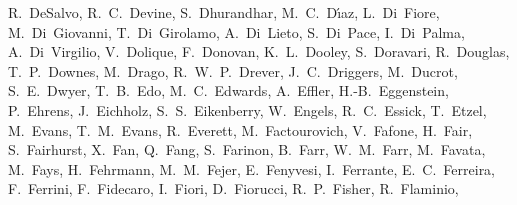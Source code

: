 {R.~DeSalvo,  %
R.~C.~Devine,  %
S.~Dhurandhar,  %
M.~C.~D\'{\i}az,  %
L.~Di~Fiore, %
M.~Di~Giovanni, %
T.~Di~Girolamo, %
A.~Di~Lieto, %
S.~Di~Pace, %
I.~Di~Palma,  %
A.~Di~Virgilio, %
V.~Dolique, %
F.~Donovan,  %
K.~L.~Dooley,  %
S.~Doravari,  %
R.~Douglas,  %
T.~P.~Downes,  %
M.~Drago,  %
R.~W.~P.~Drever,  %
J.~C.~Driggers,  %
M.~Ducrot, %
S.~E.~Dwyer,  %
T.~B.~Edo,  %
M.~C.~Edwards,  %
A.~Effler,  %
H.-B.~Eggenstein,  %
P.~Ehrens,  %
J.~Eichholz,  %
S.~S.~Eikenberry,  %
W.~Engels,  %
R.~C.~Essick,  %
T.~Etzel,  %
M.~Evans,  %
T.~M.~Evans,  %
R.~Everett,  %
M.~Factourovich,  %
V.~Fafone, %
H.~Fair,	%
S.~Fairhurst,  %
X.~Fan,  %
Q.~Fang,  %
S.~Farinon, %
B.~Farr,  %
W.~M.~Farr,  %
M.~Favata,  %
M.~Fays,  %
H.~Fehrmann,  %
M.~M.~Fejer, %
E.~Fenyvesi,  %
I.~Ferrante, %
E.~C.~Ferreira,  %
F.~Ferrini, %
F.~Fidecaro, %
I.~Fiori, %
D.~Fiorucci, %
R.~P.~Fisher,  %
R.~Flaminio, %
}
